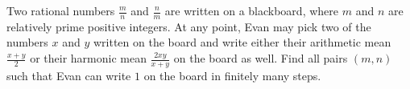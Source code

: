 Two rational numbers $\tfrac{m}{n}$ and $\tfrac{n}{m}$ are written on a blackboard, where $m$ and $n$ are relatively prime positive integers. At any point, Evan may pick two of the numbers $x$ and $y$ written on the board and write either their arithmetic mean $\tfrac{x+y}{2}$ or their harmonic mean $\tfrac{2xy}{x+y}$ on the board as well. Find all pairs $(m,n)$ such that Evan can write $1$ on the board in finitely many steps.